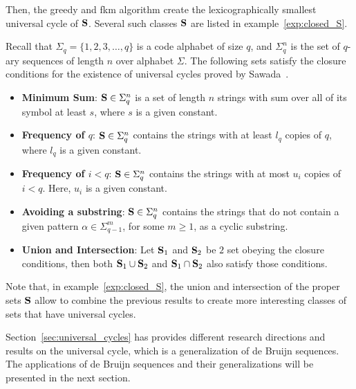 Then, the greedy and \gls{fkm} algorithm create the lexicographically smallest universal cycle of ${\mathbf S}$. Several such classes ${\mathbf S}$ are listed in example~\ref{exp:closed_S}.

\begin{example}\label{exp:closed_S}
Recall that $\Sigma_{q}=\{1,2,3,\ldots,q\}$ is a code alphabet of size $q$, and $\Sigma_{q}^{n}$ is the set of $q$-ary sequences of length $n$ over alphabet $\Sigma$. The following sets satisfy the closure conditions for the existence of universal cycles proved by Sawada~\cite{sawada2016generalizing}.
\begin{itemize}
    \item \textbf{Minimum Sum}: ${\mathbf S}\in\Sigma_{q}^{n}$ is a set of length $n$ strings with sum over all of its symbol at least $s$, where $s$ is a given constant.
    \item \textbf{Frequency of $q$}: ${\mathbf S}\in\Sigma_{q}^{n}$ contains the strings with at least $l_{q}$ copies of $q$, where $l_{q}$ is a given constant.
    \item \textbf{Frequency of $i<q$}: ${\mathbf S}\in\Sigma_{q}^{n}$ contains the strings with at most $u_{i}$ copies of $i<q$. Here, $u_{i}$ is a given constant.
    \item \textbf{Avoiding a substring}: ${\mathbf S}\in\Sigma_{q}^{n}$ contains the strings that do not contain a given pattern $\alpha\in\Sigma_{q-1}^{m}$, for some $m\geq1$, as a cyclic substring. 
    \item \textbf{Union and Intersection}: Let ${\mathbf S}_{1}$ and ${\mathbf S}_{2}$ be $2$ set obeying the closure conditions, then both ${\mathbf S}_{1}\cup {\mathbf S}_{2}$ and ${\mathbf S}_{1}\cap {\mathbf S}_{2}$ also satisfy those conditions.
\end{itemize}
\end{example}
Note that, in example~\ref{exp:closed_S}, the union and intersection of the proper sets ${\mathbf S}$ allow to combine the previous results to create more interesting classes of sets that have universal cycles. 

Section~\ref{sec:universal_cycles} has provides different research directions and results on the universal cycle, which is a generalization of de Bruijn sequences. The applications of de Bruijn sequences and their generalizations will be presented in the next section. 
